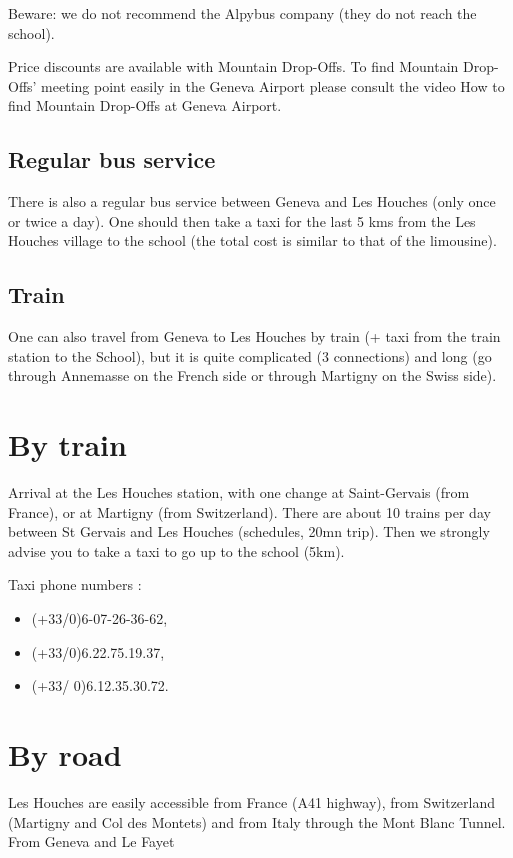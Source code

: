 Beware: we do not recommend the Alpybus company (they do not reach the school).

Price discounts are available with Mountain Drop-Offs. To find Mountain Drop-Offs' meeting point easily in the Geneva Airport please consult the video How to find Mountain Drop-Offs at Geneva Airport.

\subsection{Regular bus service}

There is also a regular bus service between Geneva and Les Houches (only once or twice a day). One should then take a taxi for the last 5 kms from the Les Houches village to the school (the total cost is similar to that of the limousine).

\subsection{Train}

One can also travel from Geneva to Les Houches by train (+ taxi from the train station to the School), but it is quite complicated (3 connections) and long (go through Annemasse on the French side or through Martigny on the Swiss side).

\section{By train}

Arrival at the Les Houches station, with one change at Saint-Gervais (from France), or at Martigny (from Switzerland). 
There are about 10 trains per day between St Gervais and Les Houches (schedules, 20mn trip). 
Then we strongly advise you to take a taxi to go up to the school (5km).

Taxi phone numbers :
\begin{itemize}
\item (+33/0)6-07-26-36-62,
\item (+33/0)6.22.75.19.37,
\item (+33/ 0)6.12.35.30.72.
\end{itemize}

\section{By road}

Les Houches are easily accessible from France (A41 highway), from Switzerland (Martigny and Col des Montets) and from Italy through the Mont Blanc Tunnel.
From Geneva and Le Fayet

